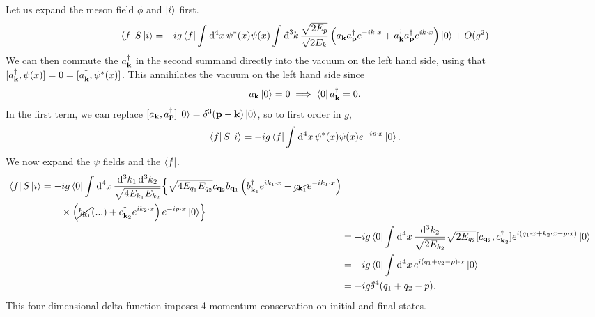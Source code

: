 Let us expand the meson field $\phi$ and $\ket{i}$ first.
\begin{equation}
  \bra{f}S \ket{i} = -ig \bra{f} \int_{}^{} \dd[4]{x} \psi^*(x) \psi(x) \int_{}^{} \bdd[3]{k} \frac{\sqrt{2E_p}}{\sqrt{2E_k}} \left( a_{\vb{k}} a_{\vb{p}}^{\dagger} e^{-i k \cdot x} + a^{\dagger}_{\vb{k}} a^{\dagger}_{\vb{p}} e^{i k \cdot x} \right) \ket{0} + O(g^2)
\end{equation}
We can then commute the $a_{\vb{k}}^{\dagger}$ in the second summand directly into the vacuum on the left hand side, using that $[a_{\vb{k}}^{\dagger}, \psi(x)] = 0 = [a_{\vb{k}}^{\dagger}, \psi^*(x)]$. 
This annihilates the vacuum on the left hand side since
\begin{equation}
  a_{\vb{k}} \ket{0} = 0 \implies \bra{0} a_{\vb{k}}^{\dagger} = 0.
\end{equation}
In the first term, we can replace $[a_{\vb{k}}, a_{\vb{p}}^{\dagger}] \ket{0} = \bdelta^3(\vb{p}-\vb{k}) \ket{0}$, so to first order in $g$, 
\begin{equation}
  \bra{f}S \ket{i} = -ig \bra{f} \int_{}^{} \dd[4]{x}  \psi^*(x) \psi(x) e^{-ip \cdot x} \ket{0}.
\end{equation}
We now expand the $\psi$ fields and the $\bra{f}$.
\begin{align}
  \begin{split}
\bra{f}S \ket{i} &= -ig \bra{0} \int_{}^{} \dd[4]{x} \frac{\dd[3]{k_1} \dd[3]{k_2}}{\sqrt{4 E_{k_1} E_{k_2}}} \Bigr\{ \sqrt{4 E_{q_1} E_{q_2}} c_{\vb{q}_2} b_{\vb{q}_1} \left( b^{\dagger}_{\vb{k}_1} e^{i k_1 \cdot x} + \cancel{c_{\vb{k}_1}} e^{-i k_1 \cdot x} \right) \\
		   &\qquad\times\left( \cancel{b_{\vb{k}_1}}(...) + c_{\vb{k}_2}^{\dagger} e^{i k_2 \cdot x} \right) e^{-i p \cdot x} \ket{0} \Bigr\}
  \end{split}
  \\
		   &= -i g \bra{0} \int_{}^{} \dd[4]{x} \frac{\dd[3]{k_2}}{\sqrt{2 E_{k_2}}} \sqrt{2 E_{q_2}} [c_{\vb{q}_2}, c ^{\dagger}_{\vb{k}_2} ] e^{i (q_1 \cdot x + k_2 \cdot x - p \cdot x)} \ket{0} \\
		   &=- ig \bra{0} \int_{}^{} \dd[4]{x} e^{i(q_1 + q_2 -p) \cdot x} \ket{0} \\
		   &=-i g \bdelta^4(q_1 + q_2 -p).
\end{align}
This four dimensional delta function imposes 4-momentum conservation on initial and final states.
